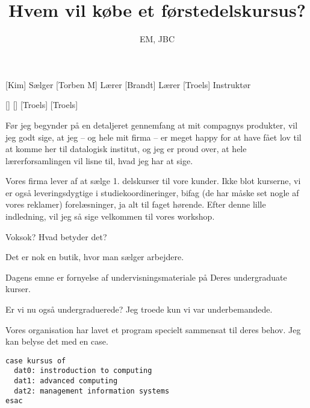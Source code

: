 \documentclass[a4paper,11pt]{article}
\title{Hvem vil købe et førstedelskursus?}
\author{EM, JBC}
\begin{document}
\maketitle

\begin{roles}
[Kim] Sælger
[Torben M] Lærer
[Brandt] Lærer
[Troels] Instruktør
\end{roles}

\begin{props}
  []
  []
  [Troels]
  [Troels]
\end{props}


\begin{sketch}


   Før jeg begynder på en detaljeret gennemfang at mit
  compagnys produkter, vil jeg godt sige, at jeg -- og hele mit firma
  -- er meget happy for at have fået lov til at komme her til
  datalogisk institut, og jeg er proud over, at hele lærerforsamlingen
  vil lisne til, hvad jeg har at sige.

  Vores firma lever af at sælge 1. delskurser til vore kunder.  Ikke
  blot kurserne, vi er også leveringsdygtige i studiekoordineringer,
  bifag (de har måske set nogle af vores reklamer) forelæsninger, ja
  alt til faget hørende.  Efter denne lille indledning, vil jeg så
  sige velkommen til vores workshop.

 Voksok?  Hvad betyder det?

 Det er nok en butik, hvor man sælger arbejdere.

 Dagens emne er fornyelse af undervisningsmateriale på Deres
undergraduate kurser.

 Er vi nu også undergraduerede?  Jeg troede kun vi var underbemandede.

 Vores organisation har lavet et program specielt sammensat
til deres behov.  Jeg kan belyse det med en case.


\begin{verbatim}
case kursus of
  dat0: instroduction to computing
  dat1: advanced computing
  dat2: management information systems
esac
\end{verbatim}


\end{sketch}
\end{document}
